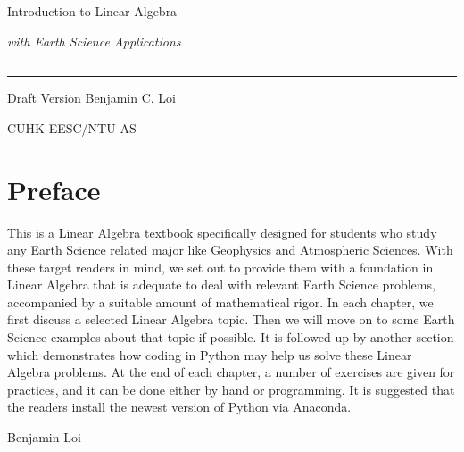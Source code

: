 \begin{titlepage}
    {\Huge\raggedright Introduction to Linear Algebra \par}
    {\Large\raggedright \textit{with Earth Science Applications} \hfill\textcolor{Mahogany}{\rule{3mm}{3mm}} \par}
    \vspace{3mm}\hrule\par
    {\Large\raggedleft Draft Version \hfill Benjamin C. Loi \par}
    \vfill
    {\Large\raggedleft CUHK-EESC/NTU-AS \par}
\end{titlepage}

\chapter*{Preface}
This is a Linear Algebra textbook specifically designed for students who study any Earth Science related major like Geophysics and Atmospheric Sciences. With these target readers in mind, we set out to provide them with a foundation in Linear Algebra that is adequate to deal with relevant Earth Science problems, accompanied by a suitable amount of mathematical rigor. In each chapter, we first discuss a selected Linear Algebra topic. Then we will move on to some Earth Science examples about that topic if possible. It is followed up by another section which demonstrates how coding in Python may help us solve these Linear Algebra problems. At the end of each chapter, a number of exercises are given for practices, and it can be done either by hand or programming. It is suggested that the readers install the newest version of Python via Anaconda. \par
{\raggedleft Benjamin Loi \par}

\tableofcontents